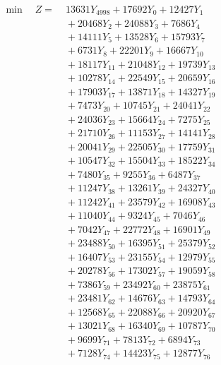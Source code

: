 \documentclass[a4paper,10pt]{article}
\begin{document}
\allowdisplaybreaks
{\small
\begin{align}
\min \quad Z = &\; 13631 Y_{4998} + 17692 Y_{0} + 12427 Y_{1} \\[0.3ex]
&\;  + 20468 Y_{2} + 24088 Y_{3} + 7686 Y_{4} \\[0.3ex]
&\;  + 14111 Y_{5} + 13528 Y_{6} + 15793 Y_{7} \\[0.3ex]
&\;  + 6731 Y_{8} + 22201 Y_{9} + 16667 Y_{10} \\[0.3ex]
&\;  + 18117 Y_{11} + 21048 Y_{12} + 19739 Y_{13} \\[0.3ex]
&\;  + 10278 Y_{14} + 22549 Y_{15} + 20659 Y_{16} \\[0.3ex]
&\;  + 17903 Y_{17} + 13871 Y_{18} + 14327 Y_{19} \\[0.3ex]
&\;  + 7473 Y_{20} + 10745 Y_{21} + 24041 Y_{22} \\[0.3ex]
&\;  + 24036 Y_{23} + 15664 Y_{24} + 7275 Y_{25} \\[0.3ex]
&\;  + 21710 Y_{26} + 11153 Y_{27} + 14141 Y_{28} \\[0.5ex]\allowbreak
&\;  + 20041 Y_{29} + 22505 Y_{30} + 17759 Y_{31} \\[0.3ex]
&\;  + 10547 Y_{32} + 15504 Y_{33} + 18522 Y_{34} \\[0.3ex]
&\;  + 7480 Y_{35} + 9255 Y_{36} + 6487 Y_{37} \\[0.3ex]
&\;  + 11247 Y_{38} + 13261 Y_{39} + 24327 Y_{40} \\[0.3ex]
&\;  + 11242 Y_{41} + 23579 Y_{42} + 16908 Y_{43} \\[0.3ex]
&\;  + 11040 Y_{44} + 9324 Y_{45} + 7046 Y_{46} \\[0.3ex]
&\;  + 7042 Y_{47} + 22772 Y_{48} + 16901 Y_{49} \\[0.3ex]
&\;  + 23488 Y_{50} + 16395 Y_{51} + 25379 Y_{52} \\[0.3ex]
&\;  + 16407 Y_{53} + 23155 Y_{54} + 12979 Y_{55} \\[0.3ex]
&\;  + 20278 Y_{56} + 17302 Y_{57} + 19059 Y_{58} \\[0.5ex]\allowbreak
&\;  + 7386 Y_{59} + 23492 Y_{60} + 23875 Y_{61} \\[0.3ex]
&\;  + 23481 Y_{62} + 14676 Y_{63} + 14793 Y_{64} \\[0.3ex]
&\;  + 12568 Y_{65} + 22088 Y_{66} + 20920 Y_{67} \\[0.3ex]
&\;  + 13021 Y_{68} + 16340 Y_{69} + 10787 Y_{70} \\[0.3ex]
&\;  + 9699 Y_{71} + 7813 Y_{72} + 6894 Y_{73} \\[0.3ex]
&\;  + 7128 Y_{74} + 14423 Y_{75} + 12877 Y_{76} \\[0.3ex]

\end{align}}
\end{document}
